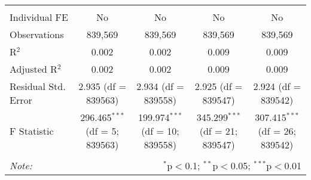 \documentclass[
]{article}
\begin{document}
\begin{table}[!htbp]
{\begin{tabular}{@{\extracolsep{5pt}}lcccc}
  & & & & \\ 
\hline \\[-1.8ex] 
Individual FE & No & No & No & No \\ 
Observations & 839,569 & 839,569 & 839,569 & 839,569 \\ 
R$^{2}$ & 0.002 & 0.002 & 0.009 & 0.009 \\ 
Adjusted R$^{2}$ & 0.002 & 0.002 & 0.009 & 0.009 \\ 
Residual Std. Error & 2.935 (df = 839563) & 2.934 (df = 839558) & 2.925 (df = 839547) & 2.924 (df = 839542) \\ 
F Statistic & 296.465$^{***}$ (df = 5; 839563) & 199.974$^{***}$ (df = 10; 839558) & 345.299$^{***}$ (df = 21; 839547) & 307.415$^{***}$ (df = 26; 839542) \\ 
\hline 
\hline \\[-1.8ex] 
\textit{Note:}  & \multicolumn{4}{r}{$^{*}$p$<$0.1; $^{**}$p$<$0.05; $^{***}$p$<$0.01} \\ 
\end{tabular}
} 
\end{table} 
\newpage
\end{document}
